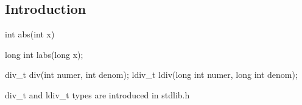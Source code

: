 
\subsection{Introduction}


int abs(int x)

long int labs(long x);

div\_t div(int numer, int denom);
ldiv\_t ldiv(long int numer, long int denom);

div\_t and ldiv\_t types are introduced in stdlib.h
